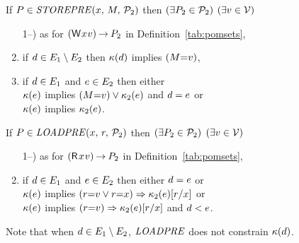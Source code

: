 \begin{definition}
  \noindent
  If $\aPS\SB0 \in \sSTOREPRE{\aLoc}{\aExp}{\aPSS_2}$ then
  $(\exists\aPS_2\in\aPSS_2)$
  $(\exists\aVal\in\Val)$
  \begin{enumerate}
     \setcounter{enumi}{\value{pomsetPrefixOrderCount}}
  \item[1--\thepomsetPrefixOrderCount)] as for $\DWP{\aLoc}{\aVal}\sPREFIX\aPS_2$ in
    Definition~\ref{tab:pomsets}, %
  \item if $\bEv\in\aEvs_1\setminus\aEvs_2$ then $\labelingForm\SB0(\bEv)$ implies $(\aExp{=}\aVal)$,
  \item if $\bEv\in\aEvs_1$ and $\aEv\in\aEvs_2$ then either\\
    $\labelingForm\SB0(\aEv)$ implies $(\aExp{=}\aVal)\lor \labelingForm_2(\aEv)$ and $\bEv=\aEv$ or \\
    $\labelingForm\SB0(\aEv)$ implies $\labelingForm_2(\aEv)$.
  \end{enumerate}

  \noindent
  If $\aPS\SB0 \in \sLOADPRE{\aLoc}{\aReg}{\aPSS_2}$ then
  $(\exists\aPS_2\in\aPSS_2)$
  $(\exists\aVal\in\Val)$
  \begin{enumerate}
     \setcounter{enumi}{\value{pomsetPrefixOrderCount}}
  \item[1--\thepomsetPrefixOrderCount)] as for $\DRP{\aLoc}{\aVal}\sPREFIX\aPS_2$ in
    Definition~\ref{tab:pomsets}, %
  \item if $\bEv\in\aEvs_1$ and $\aEv\in\aEvs_2$ then either $\bEv=\aEv$ or\\
    $\labelingForm\SB0(\aEv)$ implies $(\aReg{=}\aVal\lor\aReg{=}\aLoc)\limplies\labelingForm_2(\aEv)[\aReg/\aLoc]$ or\\
    $\labelingForm\SB0(\aEv)$ implies $(\aReg{=}\aVal)\limplies\labelingForm_2(\aEv)[\aReg/\aLoc]$ and $\bEv<\SB0\aEv$.
  \end{enumerate}  
\end{definition}
Note that when $\bEv\in\aEvs_1\setminus\aEvs_2$, $\sLOADPRE{}{}{}$ does not
constrain $\labelingForm\SB0(\bEv)$.

